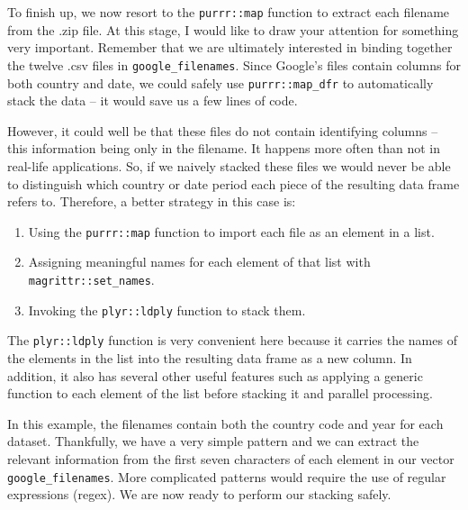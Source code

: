 \documentclass[
]{book}
\providecommand{\tightlist}{%
  \setlength{\itemsep}{0pt}\setlength{\parskip}{0pt}}
\begin{document}
To finish up, we now resort to the \texttt{purrr::map} function to extract each filename from the .zip file. At this stage, I would like to draw your attention for something very important. Remember that we are ultimately interested in binding together the twelve .csv files in \texttt{google\_filenames}. Since Google's files contain columns for both country and date, we could safely use \texttt{purrr::map\_dfr} to automatically stack the data -- it would save us a few lines of code.

However, it could well be that these files do not contain identifying columns -- this information being only in the filename. It happens more often than not in real-life applications. So, if we naively stacked these files we would never be able to distinguish which country or date period each piece of the resulting data frame refers to. Therefore, a better strategy in this case is:

\begin{enumerate}
\def\labelenumi{\arabic{enumi}.}
\tightlist
\item
  Using the \texttt{purrr::map} function to import each file as an element in a list.
\item
  Assigning meaningful names for each element of that list with \texttt{magrittr::set\_names}.
\item
  Invoking the \texttt{plyr::ldply} function to stack them.
\end{enumerate}

The \texttt{plyr::ldply} function is very convenient here because it carries the names of the elements in the list into the resulting data frame as a new column. In addition, it also has several other useful features such as applying a generic function to each element of the list before stacking it and parallel processing.

In this example, the filenames contain both the country code and year for each dataset. Thankfully, we have a very simple pattern and we can extract the relevant information from the first seven characters of each element in our vector \texttt{google\_filenames}. More complicated patterns would require the use of regular expressions (regex). We are now ready to perform our stacking safely.
\end{document}
